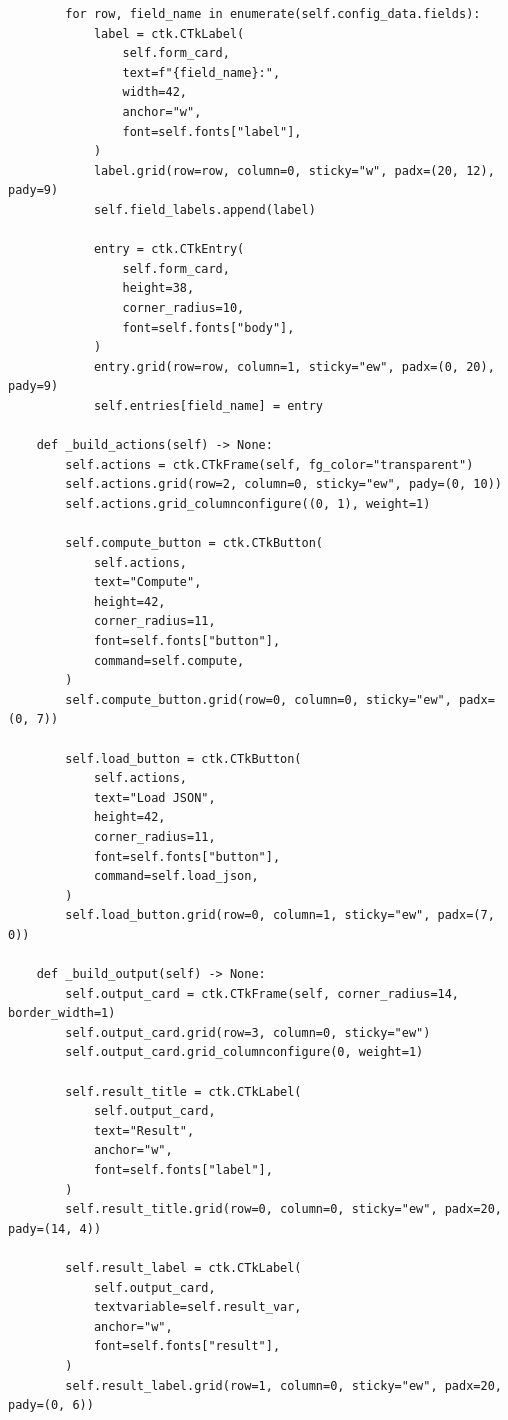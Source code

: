 \documentclass[12pt,a4paper]{article}
\begin{document}
\begin{verbatim}
        for row, field_name in enumerate(self.config_data.fields):
            label = ctk.CTkLabel(
                self.form_card,
                text=f"{field_name}:",
                width=42,
                anchor="w",
                font=self.fonts["label"],
            )
            label.grid(row=row, column=0, sticky="w", padx=(20, 12), pady=9)
            self.field_labels.append(label)

            entry = ctk.CTkEntry(
                self.form_card,
                height=38,
                corner_radius=10,
                font=self.fonts["body"],
            )
            entry.grid(row=row, column=1, sticky="ew", padx=(0, 20), pady=9)
            self.entries[field_name] = entry

    def _build_actions(self) -> None:
        self.actions = ctk.CTkFrame(self, fg_color="transparent")
        self.actions.grid(row=2, column=0, sticky="ew", pady=(0, 10))
        self.actions.grid_columnconfigure((0, 1), weight=1)

        self.compute_button = ctk.CTkButton(
            self.actions,
            text="Compute",
            height=42,
            corner_radius=11,
            font=self.fonts["button"],
            command=self.compute,
        )
        self.compute_button.grid(row=0, column=0, sticky="ew", padx=(0, 7))

        self.load_button = ctk.CTkButton(
            self.actions,
            text="Load JSON",
            height=42,
            corner_radius=11,
            font=self.fonts["button"],
            command=self.load_json,
        )
        self.load_button.grid(row=0, column=1, sticky="ew", padx=(7, 0))

    def _build_output(self) -> None:
        self.output_card = ctk.CTkFrame(self, corner_radius=14, border_width=1)
        self.output_card.grid(row=3, column=0, sticky="ew")
        self.output_card.grid_columnconfigure(0, weight=1)

        self.result_title = ctk.CTkLabel(
            self.output_card,
            text="Result",
            anchor="w",
            font=self.fonts["label"],
        )
        self.result_title.grid(row=0, column=0, sticky="ew", padx=20, pady=(14, 4))

        self.result_label = ctk.CTkLabel(
            self.output_card,
            textvariable=self.result_var,
            anchor="w",
            font=self.fonts["result"],
        )
        self.result_label.grid(row=1, column=0, sticky="ew", padx=20, pady=(0, 6))


\end{verbatim}
\end{document}
